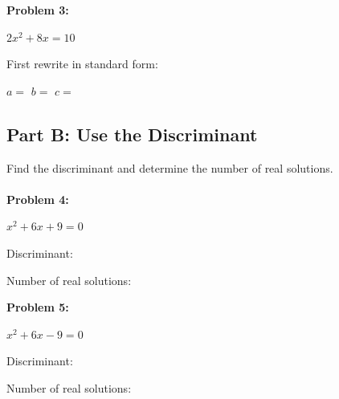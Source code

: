 \documentclass[12pt]{article}
\begin{document}
			\vspace{1cm}

			\textbf{Problem 3:}
            
            $2x^2 + 8x = 10$

			\vspace{1.5cm}

			First rewrite in standard form: \underline{\hspace{3in}}

			\vspace{1.5cm}

			$a = $ \underline{\hspace{1in}} \quad $b = $ \underline{\hspace{1in}} \quad $c = $ \underline{\hspace{1in}}

			\newpage

		\subsection*{Part B: Use the Discriminant}

			Find the discriminant and determine the number of real solutions.\\\\

			\textbf{Problem 4:}
            
            $x^2 + 6x + 9 = 0$

			\vspace{2.7cm}

			Discriminant: \underline{\hspace{2in}}

			\vspace{0.5cm}

			Number of real solutions: \underline{\hspace{2in}}

			\vspace{0.5cm}

			\textbf{Problem 5:}
            
            $x^2 + 6x - 9 = 0$

			\vspace{2.7cm}

			Discriminant: \underline{\hspace{2in}}

			\vspace{0.5cm}

			Number of real solutions: \underline{\hspace{2in}}
\end{document}
